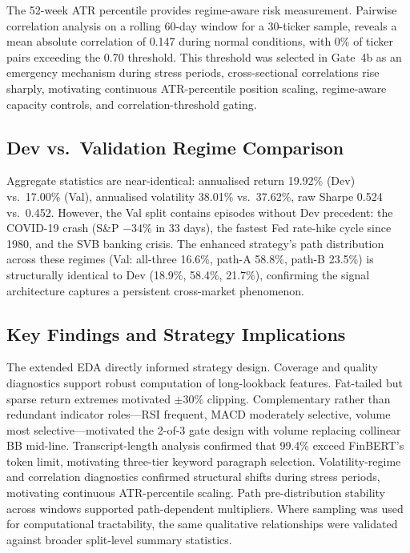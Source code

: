 \documentclass[11pt,twoside,a4paper]{article}
\begin{document}
The 52-week ATR percentile provides regime-aware risk measurement. Pairwise correlation analysis on a rolling 60-day window for a 30-ticker sample, reveals a mean absolute correlation of 0.147 during normal conditions, with 0\% of ticker pairs exceeding the 0.70 threshold. This threshold was selected in Gate~4b as an emergency mechanism during stress periods, cross-sectional correlations rise sharply, motivating continuous ATR-percentile position scaling, regime-aware capacity controls, and correlation-threshold gating.

\subsection{Dev vs.\ Validation Regime Comparison}

Aggregate statistics are near-identical: annualised return 19.92\% (Dev) vs.\ 17.00\% (Val), annualised volatility 38.01\% vs.\ 37.62\%, raw Sharpe 0.524 vs.\ 0.452. However, the Val split contains episodes without Dev precedent: the COVID-19 crash (S\&P $-34\%$ in 33 days), the fastest Fed rate-hike cycle since 1980, and the SVB banking crisis. The enhanced strategy's path distribution across these regimes (Val: all-three 16.6\%, path-A 58.8\%, path-B 23.5\%) is structurally identical to Dev (18.9\%, 58.4\%, 21.7\%), confirming the signal architecture captures a persistent cross-market phenomenon.

\subsection{Key Findings and Strategy Implications}

The extended EDA directly informed strategy design. Coverage and quality diagnostics support robust computation of long-lookback features. Fat-tailed but sparse return extremes motivated $\pm 30\%$ clipping. Complementary rather than redundant indicator roles---RSI frequent, MACD moderately selective, volume most selective---motivated the 2-of-3 gate design with volume replacing collinear BB mid-line. Transcript-length analysis confirmed that 99.4\% exceed FinBERT's token limit, motivating three-tier keyword paragraph selection. Volatility-regime and correlation diagnostics confirmed structural shifts during stress periods, motivating continuous ATR-percentile scaling. Path pre-distribution stability across windows supported path-dependent multipliers. Where sampling was used for computational tractability, the same qualitative relationships were validated against broader split-level summary statistics.
\end{document}
